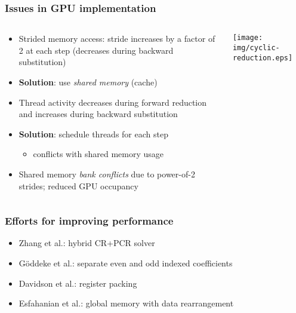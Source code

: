 \begin{frame}
\frametitle{Issues in GPU implementation}
\footnotesize
\begin{columns}
\begin{column}{0.5\textwidth}
\begin{itemize}
    \item Strided memory access:
        stride increases by a factor of 2 at each step
        (decreases during backward substitution)
    \item \textbf{Solution}: use \emph{shared memory} (cache)
    \item Thread activity decreases during forward
        reduction and increases during backward substitution
    \item \textbf{Solution}: schedule threads for each step
        \begin{itemize}
            \footnotesize
            \item conflicts with shared memory usage
        \end{itemize}
    \item Shared memory \emph{bank conflicts}
        due to power-of-2 strides; reduced GPU occupancy
\end{itemize}
\end{column}
\begin{column}{0.5\textwidth}
\texttt{[image: img/cyclic-reduction.eps]}
\end{column}
\end{columns}
\end{frame}

\begin{frame}
\frametitle{Efforts for improving performance}
\begin{itemize}
    \item Zhang et al.: hybrid CR+PCR solver
    \item G{\"o}ddeke et al.: separate even and odd indexed
        coefficients
    \item Davidson et al.: register packing
    \item Esfahanian et al.: global memory with data rearrangement
\end{itemize}
\end{frame}

